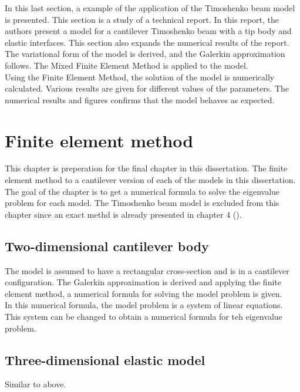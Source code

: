 \documentclass[../main.tex]{subfiles}
\begin{document}
In this last section, a example of the application of the Timoshenko beam model is presented. This section is a study of a technical report. In this report, the authors present a model for a cantilever Timoshenko beam with a tip body and elastic interfaces. This section also expands the numerical results of the report.\\

The variational form of the model is derived, and the Galerkin approximation follows. The Mixed Finite Element Method is applied to the model.\\

Using the Finite Element Method, the solution of the model is numerically calculated. Various results are given for different values of the parameters. The numerical results and figures confirms that the model behaves as expected.

\section{Finite element method}
This chapter is preperation for the final chapter in this dissertation. The finite element method to a cantilever version of each of the models in this dissertation. The goal of the chapter is to get a numerical formula to solve the eigenvalue problem for each model. The Timoshenko beam model is excluded from this chapter since an exact methd is already presented in chapter 4 (\cite{VV02}).\\

\subsection{Two-dimensional cantilever body}

The model is assumed to have a rectangular cross-section and is in a cantilever configuration. The Galerkin approximation is derived and applying the finite element method, a numerical formula for solving the model problem is given.\\

In this numerical formula, the model problem is a system of linear equations. This system can be changed to obtain a numerical formula for teh eigenvalue problem.\\


\subsection{Three-dimensional elastic model}
Similar to above.
\end{document}
